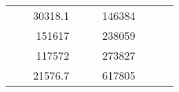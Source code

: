 \begin{table}[H]
\begin{tabular}{|ccrccrccc}
\multicolumn{1}{|c|}{\cellcolor[HTML]{FFFFC7}}                                & \multicolumn{1}{c|}{\cellcolor[HTML]{DDFDFF}}                      & \multicolumn{1}{r|}{\cellcolor[HTML]{DAE8FC}30318.1}   & \multicolumn{1}{c|}{\cellcolor[HTML]{FFFFC7}}                                & \multicolumn{1}{c|}{\cellcolor[HTML]{DDFDFF}}                       & \multicolumn{1}{r|}{\cellcolor[HTML]{DDFDFF}146384}    &                                                                              &                                                                    &                                                        \\ \cline{3-3} \cline{6-6}
\multicolumn{1}{|c|}{\cellcolor[HTML]{FFFFC7}}                                & \multicolumn{1}{c|}{\cellcolor[HTML]{DDFDFF}}                      & \multicolumn{1}{r|}{\cellcolor[HTML]{DDFDFF}151617}    & \multicolumn{1}{c|}{\cellcolor[HTML]{FFFFC7}}                                & \multicolumn{1}{c|}{\cellcolor[HTML]{DDFDFF}}                       & \multicolumn{1}{r|}{\cellcolor[HTML]{DAE8FC}238059}    &                                                                              &                                                                    &                                                        \\ \cline{3-3} \cline{6-6}
\multicolumn{1}{|c|}{\cellcolor[HTML]{FFFFC7}}                                & \multicolumn{1}{c|}{\cellcolor[HTML]{DDFDFF}}                      & \multicolumn{1}{r|}{\cellcolor[HTML]{DAE8FC}117572}    & \multicolumn{1}{c|}{\cellcolor[HTML]{FFFFC7}}                                & \multicolumn{1}{c|}{\cellcolor[HTML]{DDFDFF}}                       & \multicolumn{1}{r|}{\cellcolor[HTML]{DDFDFF}273827}    &                                                                              &                                                                    &                                                        \\ \cline{3-3} \cline{6-6}
\multicolumn{1}{|c|}{\cellcolor[HTML]{FFFFC7}}                                & \multicolumn{1}{c|}{\cellcolor[HTML]{DDFDFF}}                      & \multicolumn{1}{r|}{\cellcolor[HTML]{DDFDFF}21576.7}   & \multicolumn{1}{c|}{\cellcolor[HTML]{FFFFC7}}                                & \multicolumn{1}{c|}{\cellcolor[HTML]{DDFDFF}}                       & \multicolumn{1}{r|}{\cellcolor[HTML]{DAE8FC}617805}    &                                                                              &                                                                    &                                                        \\ \cline{3-3} \cline{6-6}

\end{tabular}
\end{table}
